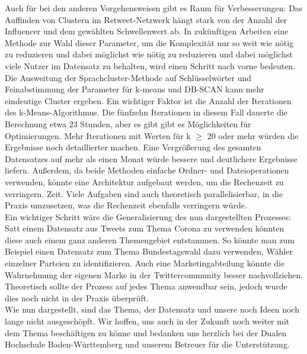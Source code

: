 Auch für bei den anderen Vorgehensweisen gibt es Raum für Verbesserungen: Das Auffinden von Clustern im Retweet-Netzwerk hängt stark von der Anzahl der Influencer und dem gewählten Schwellenwert ab. In zukünftigen Arbeiten eine Methode zur Wahl dieser Parameter, um die Komplexität nur so weit wie nötig zu reduzieren und dabei möglichst wie nötig zu reduzieren und dabei möglichst viele Nutzer im Datensatz zu behalten, wird einen Schritt nach vorne bedeuten. Die Ausweitung der Sprachcluster-Methode auf Schlüsselwörter und Feinabstimmung der Parameter für k-means und DB-SCAN kann mehr eindeutige Cluster ergeben. Ein wichtiger Faktor ist die Anzahl der Iterationen des k-Means-Algorithmus. Die fünfzehn Iterationen in diesem Fall dauerte die Berechnung etwa 23 Stunden, aber es gibt gibt es Möglichkeiten für Optimierungen. Mehr Iterationen mit Werten für k $\geq$ 20 oder mehr würden die Ergebnisse noch detaillierter machen. Eine Vergrößerung des gesamten Datensatzes auf mehr als einen Monat würde bessere und deutlichere Ergebnisse liefern. Außerdem, da beide Methoden einfache Ordner- und Dateioperationen verwenden, könnte eine Architektur aufgebaut werden, um die Rechenzeit zu verringern. Zeit. Viele Aufgaben sind auch theoretisch parallelisierbar, in die Praxis umzusetzen, was die Rechenzeit ebenfalls verringern würde. \\ \newline
Ein wichtiger Schritt wäre die Generalisierung des nun dargestellten Prozesses: Satt einem Datensatz aus Tweets zum Thema Corona zu verwenden könnten diese auch einem ganz anderen Themengebiet entstammen. So könnte man zum Beispiel einen Datensatz zum Thema Bundestagswahl dazu verwenden, Wähler einzelner Parteien zu identifizieren. Auch eine Marketingabteilung könnte die Wahrnehmung der eigenen Marke in der Twittercommunity besser nachvollziehen. Theoretisch sollte der Prozess auf jedes Thema anwendbar sein, jedoch wurde dies noch nicht in der Praxis überprüft. \\ \newline
Wie nun dargestellt, sind das Thema, der Datensatz und unsere noch Ideen noch lange nicht ausgeschöpft. Wir hoffen, uns auch in der Zukunft noch weiter mit dem Thema beschäftigen zu könne und bedanken uns herzlich bei der Dualen Hochschule Baden-Württemberg und unserem Betreuer für die Unterstützung.
